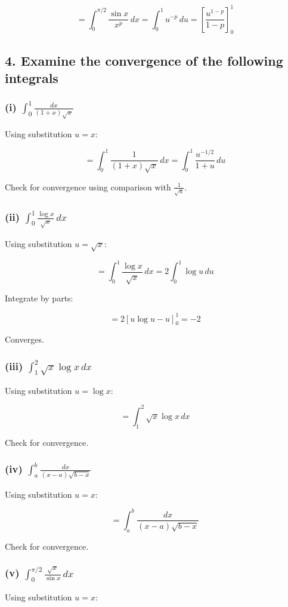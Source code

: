 \documentclass{article}
\begin{document}
\[
= \int_0^{\pi/2} \frac{\sin x}{x^p} \, dx = \int_0^1 u^{-p} \, du = \left[ \frac{u^{1-p}}{1-p} \right]_0^1
\]

\subsection*{4. Examine the convergence of the following integrals}

\subsubsection*{(i) \(\int_0^1 \frac{dx}{(1 + x)\sqrt{x}}\)}
Using substitution \( u = x \):


\[
= \int_0^1 \frac{1}{(1 + x)\sqrt{x}} \, dx = \int_0^1 \frac{u^{-1/2}}{1 + u} \, du
\]


Check for convergence using comparison with \( \frac{1}{\sqrt{u}} \).

\subsubsection*{(ii) \(\int_0^1 \frac{\log x}{\sqrt{x}} \, dx\)}
Using substitution \( u = \sqrt{x} \):


\[
= \int_0^1 \frac{\log x}{\sqrt{x}} \, dx = 2 \int_0^1 \log u \, du
\]


Integrate by parts:


\[
= 2 \left[ u \log u - u \right]_0^1 = -2
\]


Converges.

\subsubsection*{(iii) \(\int_1^2 \sqrt{x} \log x \, dx\)}
Using substitution \( u = \log x \):


\[
= \int_1^2 \sqrt{x} \log x \, dx
\]


Check for convergence.

\subsubsection*{(iv) \(\int_a^b \frac{dx}{(x - a)\sqrt{b - x}}\)}
Using substitution \( u = x \):


\[
= \int_a^b \frac{dx}{(x - a)\sqrt{b - x}}
\]


Check for convergence.

\subsubsection*{(v) \(\int_0^{\pi/2} \frac{\sqrt{x}}{\sin x} \, dx\)}
Using substitution \( u = x \):
\end{document}

